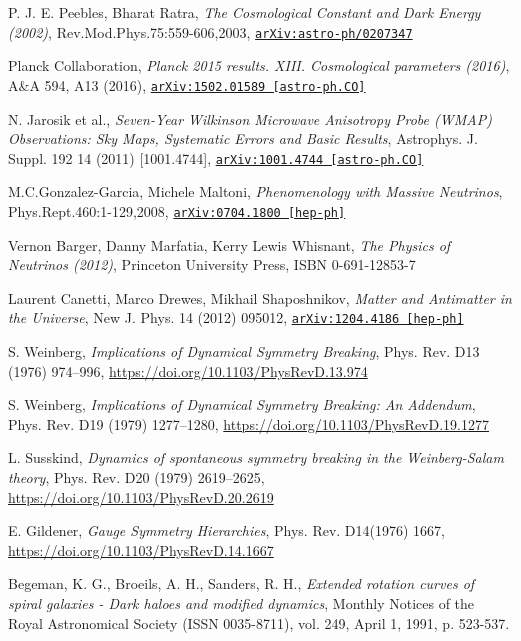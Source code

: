\documentclass[11pt,a4paper,openright,twoside]{report}
\newcommand{\bibref}[4]{#1, \textit{#2}, #3 #4}
\begin{document}
\begin{thebibliography}{9}
	\bibref{P. J. E. Peebles, Bharat Ratra}{The Cosmological Constant and Dark Energy (2002)}{Rev.Mod.Phys.75:559-606,2003,}{\href{https://arxiv.org/abs/astro-ph/0207347}{\texttt{arXiv:astro-ph/0207347}}}

	\bibref{Planck Collaboration}{Planck 2015 results. XIII. Cosmological parameters (2016)}{A\&A 594, A13 (2016),}{\href{https://arxiv.org/abs/1502.01589}{\texttt{arXiv:1502.01589 [astro-ph.CO]}}}

	\bibref{N. Jarosik et al.}{Seven-Year Wilkinson Microwave Anisotropy Probe (WMAP) Observations: Sky Maps, Systematic Errors and Basic Results}{Astrophys. J. Suppl. 192 14 (2011) [1001.4744],}{\href{https://arxiv.org/abs/1001.4744}{\texttt{arXiv:1001.4744 [astro-ph.CO]}}}

	\bibref{M.C.Gonzalez-Garcia, Michele Maltoni}{Phenomenology with Massive Neutrinos}{Phys.Rept.460:1-129,2008,}{\href{https://arxiv.org/abs/0704.1800}{\texttt{arXiv:0704.1800 [hep-ph]}}}

	\bibref{Vernon Barger, Danny Marfatia, Kerry Lewis Whisnant}{The Physics of Neutrinos (2012)}{Princeton University Press,}{ISBN 0-691-12853-7}

	\bibref{Laurent Canetti, Marco Drewes, Mikhail Shaposhnikov}{Matter and Antimatter in the Universe}{New J. Phys. 14 (2012) 095012,}{\href{https://arxiv.org/abs/1204.4186}{\texttt{arXiv:1204.4186 [hep-ph]}}}

	\bibref{S. Weinberg}{Implications of Dynamical Symmetry Breaking}{Phys. Rev. D13 (1976) 974–996,}{\url{https://doi.org/10.1103/PhysRevD.13.974}}

	\bibref{S. Weinberg}{Implications of Dynamical Symmetry Breaking:  An Addendum}{Phys. Rev. D19 (1979) 1277–1280,}{\url{https://doi.org/10.1103/PhysRevD.19.1277}}

	\bibref{L. Susskind}{Dynamics of spontaneous symmetry breaking in the Weinberg-Salam theory}{Phys. Rev. D20 (1979) 2619–2625,}{\url{https://doi.org/10.1103/PhysRevD.20.2619}}

	\bibref{E. Gildener}{Gauge Symmetry Hierarchies}{Phys. Rev. D14(1976) 1667,}{\url{https://doi.org/10.1103/PhysRevD.14.1667}}

	\bibref{Begeman, K. G., Broeils, A. H., Sanders, R. H.}{Extended rotation curves of spiral galaxies - Dark haloes and modified dynamics}{Monthly Notices of the Royal Astronomical Society (ISSN 0035-8711), vol. 249, April 1, 1991, p. 523-537.}
	

\end{thebibliography}
\end{document}
